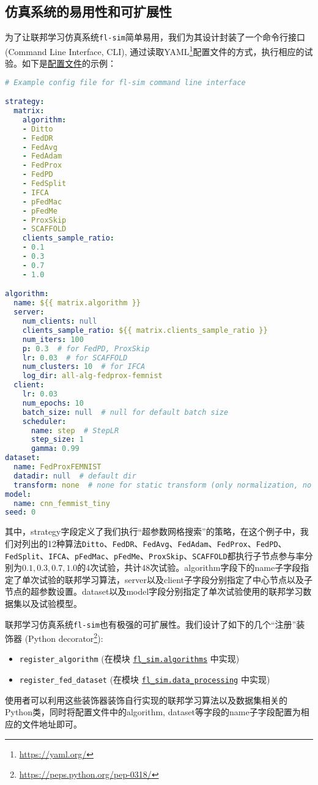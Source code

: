 \subsection{仿真系统的易用性和可扩展性}

为了让联邦学习仿真系统\texttt{fl-sim}简单易用，我们为其设计封装了一个命令行接口 (Command Line Interface, CLI), 通过读取YAML\footnote{\url{https://yaml.org/}}配置文件的方式，执行相应的试验。如下是\href{https://github.com/wenh06/fl-sim/blob/master/example-configs/all-alg-fedprox-femnist.yml}{配置文件}的示例：
\begin{lstlisting}[language=yaml]
# Example config file for fl-sim command line interface

strategy:
  matrix:
    algorithm:
    - Ditto
    - FedDR
    - FedAvg
    - FedAdam
    - FedProx
    - FedPD
    - FedSplit
    - IFCA
    - pFedMac
    - pFedMe
    - ProxSkip
    - SCAFFOLD
    clients_sample_ratio:
    - 0.1
    - 0.3
    - 0.7
    - 1.0

algorithm:
  name: ${{ matrix.algorithm }}
  server:
    num_clients: null
    clients_sample_ratio: ${{ matrix.clients_sample_ratio }}
    num_iters: 100
    p: 0.3  # for FedPD, ProxSkip
    lr: 0.03  # for SCAFFOLD
    num_clusters: 10  # for IFCA
    log_dir: all-alg-fedprox-femnist
  client:
    lr: 0.03
    num_epochs: 10
    batch_size: null  # null for default batch size
    scheduler:
      name: step  # StepLR
      step_size: 1
      gamma: 0.99
dataset:
  name: FedProxFEMNIST
  datadir: null  # default dir
  transform: none  # none for static transform (only normalization, no augmentation)
model:
  name: cnn_femmist_tiny
seed: 0
\end{lstlisting}
其中，strategy字段定义了我们执行``超参数网格搜索''的策略，在这个例子中，我们对列出的12种算法\texttt{Ditto}、\texttt{FedDR}、\texttt{FedAvg}、\texttt{FedAdam}、\texttt{FedProx}、\texttt{FedPD}、\texttt{FedSplit}、\texttt{IFCA}、\texttt{pFedMac}、\texttt{pFedMe}、\texttt{ProxSkip}、\texttt{SCAFFOLD}都执行子节点参与率分别为$0.1, 0.3, 0.7, 1.0$的4次试验，共计48次试验。algorithm字段下的name子字段指定了单次试验的联邦学习算法，server以及client子字段分别指定了中心节点以及子节点的超参数设置。dataset以及model字段分别指定了单次试验使用的联邦学习数据集以及试验模型。

联邦学习仿真系统\texttt{fl-sim}也有极强的可扩展性。我们设计了如下的几个``注册''装饰器 (Python decorator\footnote{\url{https://peps.python.org/pep-0318/}}):
\begin{itemize}
    \item \verb|register_algorithm| (在模块 \href{https://github.com/wenh06/fl-sim/blob/master/fl_sim/algorithms/_register.py}{\texttt{fl\_sim.algorithms}} 中实现)
    \item \verb|register_fed_dataset| (在模块 \href{https://github.com/wenh06/fl-sim/blob/master/fl_sim/data_processing/_register.py}{\texttt{fl\_sim.data\_processing}} 中实现)
\end{itemize}
使用者可以利用这些装饰器装饰自行实现的联邦学习算法以及数据集相关的Python类，同时将配置文件中的algorithm, dataset等字段的name子字段配置为相应的文件地址即可。
